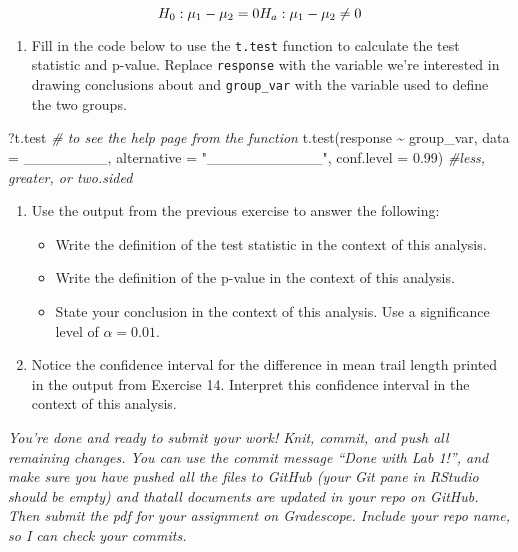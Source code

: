 \documentclass[
]{article}
\newenvironment{Shaded}{\begin{snugshade}}{\end{snugshade}}
\newcommand{\AttributeTok}[1]{\textcolor[rgb]{0.77,0.63,0.00}{#1}}
\newcommand{\CommentTok}[1]{\textcolor[rgb]{0.56,0.35,0.01}{\textit{#1}}}
\newcommand{\FloatTok}[1]{\textcolor[rgb]{0.00,0.00,0.81}{#1}}
\newcommand{\FunctionTok}[1]{\textcolor[rgb]{0.00,0.00,0.00}{#1}}
\newcommand{\NormalTok}[1]{#1}
\newcommand{\SpecialCharTok}[1]{\textcolor[rgb]{0.00,0.00,0.00}{#1}}
\newcommand{\StringTok}[1]{\textcolor[rgb]{0.31,0.60,0.02}{#1}}
\providecommand{\tightlist}{%
  \setlength{\itemsep}{0pt}\setlength{\parskip}{0pt}}
\begin{document}
\[H_0: \mu_1 - \mu_2 = 0 \\
H_a: \mu_1 - \mu_2 \neq 0\]

\begin{enumerate}
\def\labelenumi{\arabic{enumi}.}
\setcounter{enumi}{13}
\tightlist
\item
  Fill in the code below to use the \texttt{t.test} function to
  calculate the test statistic and p-value. Replace \texttt{response}
  with the variable we're interested in drawing conclusions about and
  \texttt{group\_var} with the variable used to define the two groups.
\end{enumerate}

\begin{Shaded}
\begin{Highlighting}[]
\NormalTok{?t.test }\CommentTok{\# to see the help page from the function}
\FunctionTok{t.test}\NormalTok{(response }\SpecialCharTok{\textasciitilde{}}\NormalTok{ group\_var, }\AttributeTok{data =}\NormalTok{ \_\_\_\_\_\_\_\_, }
       \AttributeTok{alternative =} \StringTok{"\_\_\_\_\_\_\_\_\_\_\_"}\NormalTok{, }
       \AttributeTok{conf.level =} \FloatTok{0.99}\NormalTok{) }\CommentTok{\#less, greater, or two.sided}
\end{Highlighting}
\end{Shaded}

\begin{enumerate}
\def\labelenumi{\arabic{enumi}.}
\setcounter{enumi}{14}
\tightlist
\item
  Use the output from the previous exercise to answer the following:

  \begin{itemize}
  \tightlist
  \item
    Write the definition of the test statistic in the context of this
    analysis.
  \item
    Write the definition of the p-value in the context of this analysis.
  \item
    State your conclusion in the context of this analysis. Use a
    significance level of \(\alpha = 0.01\).
  \end{itemize}
\item
  Notice the confidence interval for the difference in mean trail length
  printed in the output from Exercise 14. Interpret this confidence
  interval in the context of this analysis.
\end{enumerate}

\emph{You're done and ready to submit your work! Knit, commit, and push
all remaining changes. You can use the commit message ``Done with Lab
1!'', and make sure you have pushed all the files to GitHub (your Git
pane in RStudio should be empty) and thatall documents are updated in
your repo on GitHub. Then submit the pdf for your assignment on
Gradescope. Include your repo name, so I can check your commits.}
\end{document}
